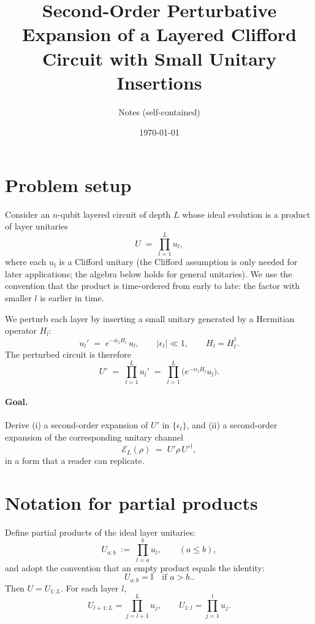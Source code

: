 \documentclass[11pt]{article}
\title{\bf Second-Order Perturbative Expansion of a Layered Clifford Circuit with Small Unitary Insertions}
\author{Notes (self-contained)}
\date{\today}
\newcommand{\id}{\mathbb{I}}
\newcommand{\cE}{\mathcal{E}}
\begin{document}
\maketitle

\section{Problem setup}

Consider an $n$-qubit layered circuit of depth $L$ whose ideal evolution is a product of layer unitaries
\begin{equation}
U \;=\; \prod_{l=1}^{L} u_l,
\label{eq:idealU}
\end{equation}
where each $u_l$ is a Clifford unitary (the Clifford assumption is only needed for later applications; the algebra below holds for general unitaries). We use the convention that the product is time-ordered from early to late: the factor with smaller $l$ is earlier in time.

We perturb each layer by inserting a small unitary generated by a Hermitian operator $H_l$:
\begin{equation}
u_l' \;=\; e^{-i\epsilon_l H_l}\, u_l,
\qquad |\epsilon_l|\ll 1,
\qquad H_l = H_l^\dagger.
\label{eq:layerPert}
\end{equation}
The perturbed circuit is therefore
\begin{equation}
U' \;=\; \prod_{l=1}^{L} u_l'
\;=\; \prod_{l=1}^{L}\Big(e^{-i\epsilon_l H_l}u_l\Big).
\label{eq:UpDef}
\end{equation}

\paragraph{Goal.}
Derive (i) a second-order expansion of $U'$ in $\{\epsilon_l\}$, and (ii) a second-order expansion of the corresponding unitary channel
\begin{equation}
\cE_L(\rho) \;=\; U'\rho\, U'^\dagger,
\label{eq:channelDef}
\end{equation}
in a form that a reader can replicate.

\section{Notation for partial products}

Define partial products of the ideal layer unitaries:
\begin{equation}
U_{a:b} \;:=\; \prod_{l=a}^{b} u_l,\qquad (a\le b),
\label{eq:Uab}
\end{equation}
and adopt the convention that an empty product equals the identity:
\begin{equation}
U_{a:b}=\id \quad \text{if } a>b..
\label{eq:empty}
\end{equation}
Then $U = U_{1:L}$. For each layer $l$,
\begin{equation}
U_{l+1:L} = \prod_{j=l+1}^{L}u_j,\qquad
U_{1:l} = \prod_{j=1}^{l}u_j.
\end{equation}
\end{document}
